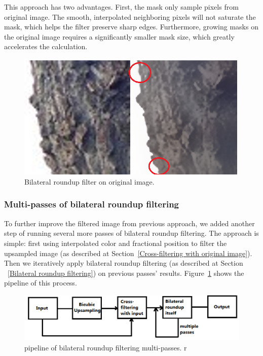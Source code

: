 This approach has two advantages. First, the mask only sample pixels from original image. The smooth, interpolated neighboring pixels will not saturate the mask, which helps the filter preserve sharp edges. Furthermore, growing masks on the original image requires a significantly smaller mask size, which greatly accelerates the calculation.
\begin{figure}\centering
\includegraphics[width=1.0\textwidth]{f8}
\caption{Bilateral roundup filter on original image.}
\end{figure}

\subsubsection{Multi-passes of bilateral roundup filtering }
To further improve the filtered image from previous approach, we added another step of running several more passes of bilateral roundup filtering. The approach is simple: first using interpolated color and fractional position to filter the upsampled image (as described at Section~\ref{Cross-filtering with original image}). Then we iteratively apply bilateral roundup filtering (as described at Section ~\ref{Bilateral roundup filtering}) on previous passes' results. Figure~\ref{fig:multi-pass pipeline} shows the pipeline of this process.

\begin{figure}[htbp]
\includegraphics[width=1.0\textwidth]{f9}
\caption{pipeline of bilateral roundup filtering multi-passes.  r}
\label{fig:multi-pass pipeline}
\end{figure}


